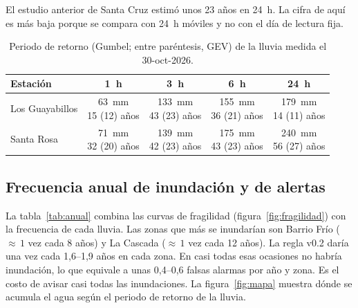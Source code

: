 \documentclass{sosg-informe}
\begin{document}
El estudio anterior de Santa Cruz estimó unos 23 años en 24~h. La cifra de aquí es más baja porque se compara con 24~h móviles y no con el día de lectura fija.

\begin{table}[ht]
  \centering\small
  \caption{Periodo de retorno (Gumbel; entre paréntesis, GEV) de la lluvia medida el 30-oct-2026.}
  \label{tab:30oct}
  \begin{tabular}{lcccc}
    \toprule
    Estación & 1~h & 3~h & 6~h & 24~h \\
    \midrule
    Los Guayabillos & \makecell{63~mm\\15 (12) años} & \makecell{133~mm\\43 (23) años} & \makecell{155~mm\\36 (21) años} & \makecell{179~mm\\14 (11) años} \\
    \addlinespace
    Santa Rosa & \makecell{71~mm\\32 (20) años} & \makecell{139~mm\\42 (23) años} & \makecell{175~mm\\43 (23) años} & \makecell{240~mm\\56 (27) años} \\
    \bottomrule
  \end{tabular}
\end{table}

\subsection{Frecuencia anual de inundación y de alertas}\label{sec:res-frecuencia}
La tabla~\ref{tab:anual} combina las curvas de fragilidad (figura~\ref{fig:fragilidad}) con la frecuencia de cada lluvia. Las zonas que más se inundarían son Barrio Frío (${\approx}\,1$ vez cada 8 años) y La Cascada (${\approx}\,1$ vez cada 12 años). La regla v0.2 daría \alto{} una vez cada 1,6--1,9 años en cada zona. En casi todas esas ocasiones no habría inundación, lo que equivale a unas 0,4--0,6 falsas alarmas por año y zona. Es el costo de avisar casi todas las inundaciones. La figura~\ref{fig:mapa} muestra dónde se acumula el agua según el periodo de retorno de la lluvia.
\end{document}
